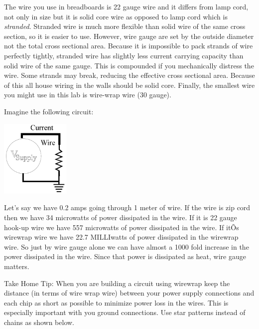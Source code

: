 \documentclass[12pt]{article}
\begin{document}
\begin{enumerate}[1.]
\par The wire you use in breadboards is 22 gauge wire and it differs from lamp cord, not only in size but it is solid core wire as opposed to lamp cord which is {\it stranded}. 
Stranded wire is much more flexible than solid wire of the same cross section, so it is easier to use. 
However, wire gauge are set by the outside diameter not the total cross sectional area. 
Because it is impossible to pack strands of wire perfectly tightly, stranded wire has slightly less current carrying capacity than solid wire of the same gauge. 
This is compounded if you mechanically distress the wire. Some strands may break, reducing the effective cross sectional area. 
Because of this all house wiring in the walls should be solid core. 
Finally, the smallest wire you might use in this lab is wire-wrap wire (30 gauge). 

\par Imagine the following circuit:

\begin{center}
\includegraphics[width=0.25\textwidth,trim=0 0 0 0,clip=false]{lab2fig1.png}
\end{center}

Let's say we have 0.2 amps going through 1 meter of wire. If the wire is zip
cord then we have 34 microwatts of power dissipated in the wire. 
If it is 22 gauge hook-up wire we have 557 microwatts of power dissipated in the wire. 
If itÕs wirewrap wire we have 22.7 MILLIwatts of power dissipated in the wirewrap wire. 
So just by wire gauge alone we can have almost a 1000 fold increase in the power dissipated in the wire. 
Since that power is dissipated as heat, wire gauge matters.

\par Take Home Tip: When you are building a circuit using wirewrap keep the distance (in terms of wire wrap wire) between your power supply connections and each chip as
short as possible to minimize power loss in the wires. 
This is especially important with you ground connections. Use star patterns instead of chains as shown below.


\end{enumerate}
\end{document}
